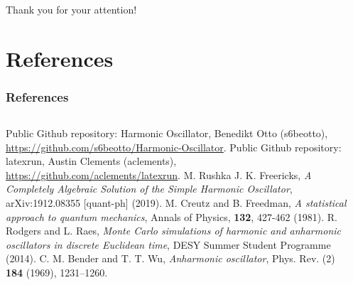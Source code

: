 \documentclass[aspectratio=169]{beamer}
\begin{document}
\begin{frame}
\frametitle{}
\begin{center}
	Thank you for your attention!
\end{center}
\end{frame}

\section{References}
\begin{frame}
\frametitle{References}
\vspace{-20px}
\begin{columns}[T]
	\begin{column}{0.49\textwidth}
		\begin{tiny}
			\begin{thebibliography}{99}
				\fontsize{6}{6}
				 Public Github repository: Harmonic Oscillator, Benedikt Otto (s6beotto), \\\url{https://github.com/s6beotto/Harmonic-Oscillator}.
				 Public Github repository: latexrun, Austin Clements (aclements), \\\url{https://github.com/aclements/latexrun}.
				 M. Rushka J. K. Freericks, \textit{A Completely Algebraic Solution of the Simple Harmonic Oscillator}, arXiv:1912.08355 [quant-ph] (2019).
				 M. Creutz and B. Freedman, \textit{A statistical approach to quantum mechanics}, Annals of Physics, \textbf{132}, 427-462 (1981).
				 R. Rodgers and L. Raes, \textit{Monte Carlo simulations of harmonic and anharmonic oscillators in discrete Euclidean time}, DESY Summer Student Programme (2014).
				 C. M. Bender and T. T. Wu, \textit{Anharmonic oscillator}, Phys. Rev. (2) \textbf{184} (1969), 1231–1260.
				\setcounter{firstbib}{\value{enumiv}}
			\end{thebibliography}
		\end{tiny}
	\end{column}
	\begin{column}{0.49\textwidth}
		\begin{tiny}
			\begin{thebibliography}{99}
				\fontsize{6}{6}
				\setcounter{enumiv}{\value{firstbib}}
			\end{thebibliography}
		\end{tiny}
	\end{column}
\end{columns}
\end{frame}
\end{document}
